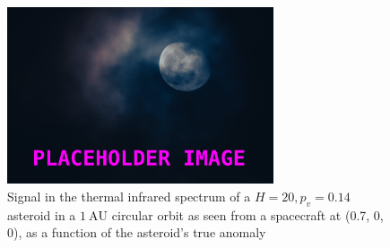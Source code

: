 \begin{figure}[htbp]
 \centering
 \includegraphics[width=0.7\textwidth]{img/implementation_tir_signal.png}
 \caption{Signal in the thermal infrared spectrum of a $H=20, p_v=0.14$ asteroid in a $1~\mathrm{AU}$ circular orbit as seen from a spacecraft at (0.7, 0, 0), as a function of the asteroid's true anomaly}
 \label{fig:thermal_signal_implementation}
\end{figure}

